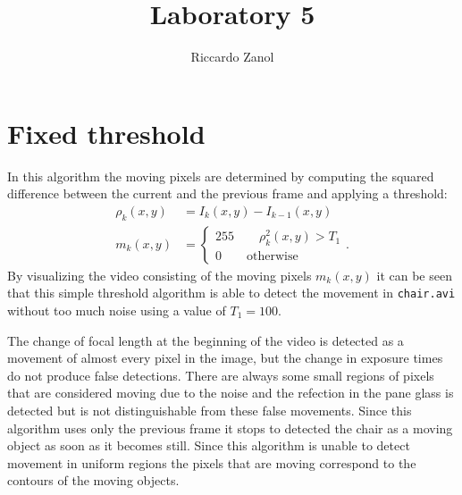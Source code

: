 \documentclass[a4paper,oneside]{article}
\author{Riccardo Zanol}
\title{Laboratory 5}
\newcommand{\inlinecode}[1]{\lstinline[basicstyle=\ttfamily,keywordstyle={},stringstyle={},commentstyle={\itshape}]{#1}}
\begin{document}
\maketitle
\section*{Fixed threshold}
In this algorithm the moving pixels are determined by computing the
squared difference between the current and the previous frame and
applying a threshold:
\begin{align}
  \rho_k(x,y) &= I_k(x,y) - I_{k-1}(x,y) \\
  m_k(x,y) &= \begin{cases}
    255 \qquad \rho_k^2(x,y) > T_1 \\
    0 \qquad \text{otherwise}
    \end{cases} .
\end{align}
By visualizing the video consisting of the moving pixels $m_k(x,y)$ it
can be seen that this simple threshold algorithm is able to detect the
movement in \inlinecode{chair.avi} without too much noise using a
value of $T_1 = 100$.

The change of focal length at the beginning of the video is detected
as a movement of almost every pixel in the image, but the change in
exposure times do not produce false detections. There are always some
small regions of pixels that are considered moving due to the noise
and the refection in the pane glass is detected but is not
distinguishable from these false movements.  Since this algorithm uses
only the previous frame it stops to detected the chair as a moving
object as soon as it becomes still.  Since this algorithm is unable
to detect movement in uniform regions the pixels that are moving
correspond to the contours of the moving objects.
\end{document}
